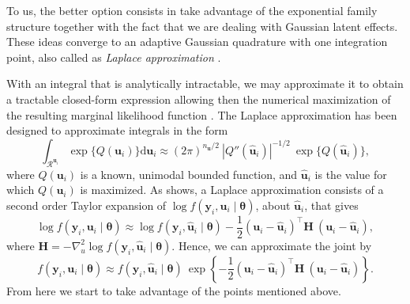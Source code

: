 To us, the better option consists in take advantage of the exponential
family structure together with the fact that we are dealing with
Gaussian latent effects. These ideas converge to an adaptive Gaussian
quadrature with one integration point, also called as \textit{Laplace
approximation}
\cite{molenberghs&verbeke, LA4H, tierney, corestats}.

With an integral that is analytically intractable, we may approximate it
to obtain a tractable closed-form expression allowing then the numerical
maximization of the resulting marginal likelihood function
\cite{patrao}. The Laplace approximation has been designed to
approximate integrals in the form
\begin{equation}
 \int_{\mathcal{R}^{\bm{u}_{i}}}
 \exp\{Q(\bm{u}_{i})\} \text{d} \bm{u}_{i}\approx
 (2\pi)^{n_{\bm{u}}/2}~
 |{Q}''(\bm{\hat{u}}_{i})|^{-1/2}~\exp\{Q(\bm{\hat{u}}_{i})\},
 \label{eq:laplace}
\end{equation}
where \(Q(\bm{u}_{i})\) is a known, unimodal bounded function, and
\(\bm{\hat{u}}_{i}\) is the value for which \(Q(\bm{u}_{i})\) is
maximized. As  shows, a Laplace approximation
consists of a second order Taylor expansion of \(\log f(\bm{y}_{i},
\bm{u}_{i} \mid \bm{\theta})\), about \(\bm{\hat{u}}_{i}\), that gives
\[
 \log f(\bm{y}_{i}, \bm{u}_{i} \mid \bm{\theta})\approx
 \log f(\bm{y}_{i}, \bm{\hat{u}}_{i} \mid \bm{\theta}) -
 \frac{1}{2} (\bm{u}_{i} - \bm{\hat{u}}_{i})^{\top}\bm{H}~
             (\bm{u}_{i} - \bm{\hat{u}}_{i}),
\]
where \(\bm{H} = - \nabla_{u}^{2} \log f(\bm{y}_{i}, \bm{\hat{u}}_{i}
\mid \bm{\theta})\). Hence, we can approximate the joint by
\begin{equation}
 f(\bm{y}_{i}, \bm{u}_{i} \mid \bm{\theta})\approx
 f(\bm{y}_{i}, \bm{\hat{u}}_{i} \mid \bm{\theta})~\exp
 \left\{-\frac{1}{2} (\bm{u}_{i} - \bm{\hat{u}}_{i})^{\top}\bm{H}~
                     (\bm{u}_{i} - \bm{\hat{u}}_{i})
 \right\}.
 \label{eq:taylor}
\end{equation}
From here we start to take advantage of the points mentioned above.

